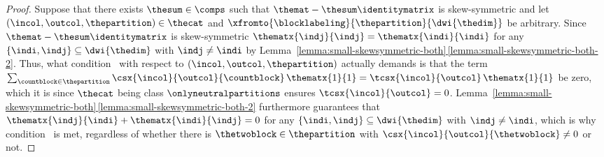 \documentclass[pdftex]{sigma}
\numberwithin{equation}{section}
\begin{document}
{\begin{proof}
      Suppose that there exists $\thesum\in\comps$ such that $\themat-\thesum\identitymatrix$ is skew-symmetric and let $(\incol,\outcol,\thepartition)\in\thecat$  and $\xfromto{\blocklabeling}{\thepartition}{\dwi{\thedim}}$ be arbitrary.
      Since $\themat-\thesum\identitymatrix$ is skew-symmetric $\thematx{\indj}{\indj}=\thematx{\indi}{\indi}$ for any $\{\indi,\indj\}\subseteq \dwi{\thedim}$ with $\indj\neq \indi$ by Lem\-ma~\hyperref[lemma:small-skewsymmetric-both-2]{\ref*{lemma:small-skewsymmetric-both}\,\ref*{lemma:small-skewsymmetric-both-2}}. Thus, what con\-di\-tion~\conditionone{} with respect to $(\incol,\outcol,\thepartition)$ actually demands is that the term $\sum_{\countblock\in\thepartition}\csx{\incol}{\outcol}{\countblock}\,\thematx{1}{1}=\tcsx{\incol}{\outcol}\,\thematx{1}{1}$ be zero, which it is since $\thecat$ being class $\onlyneutralpartitions$ ensures $\tcsx{\incol}{\outcol}=0$. Lem\-ma~\hyperref[lemma:small-skewsymmetric-both-2]{\ref*{lemma:small-skewsymmetric-both}\,\ref*{lemma:small-skewsymmetric-both-2}} furthermore guarantees that $\thematx{\indj}{\indi}+\thematx{\indi}{\indj}=0$ for any $\{\indi,\indj\}\subseteq \dwi{\thedim}$ with $\indj\neq \indi$, which is why con\-di\-tion~\conditiontwo{} is met, regardless of whether there is $\thetwoblock\in \thepartition$ with $\csx{\incol}{\outcol}{\thetwoblock}\neq 0$ or not.


\end{proof}}
\end{document}
